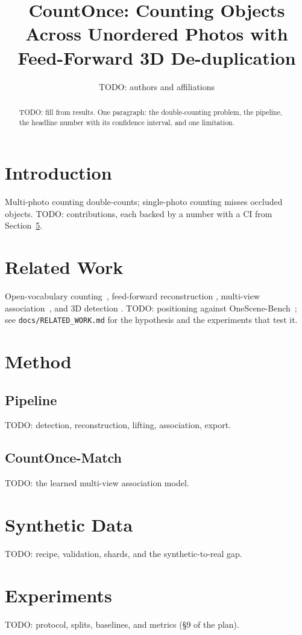 \documentclass[10pt,twocolumn]{article}
\title{CountOnce: Counting Objects Across Unordered Photos with Feed-Forward 3D De-duplication}
\author{TODO: authors and affiliations}
\date{}
\begin{document}
\maketitle

\begin{abstract}
TODO: fill from results. One paragraph: the double-counting problem, the pipeline, the headline
number with its confidence interval, and one limitation.
\end{abstract}

\section{Introduction}
Multi-photo counting double-counts; single-photo counting misses occluded objects.
TODO: contributions, each backed by a number with a CI from Section~\ref{sec:experiments}.

\section{Related Work}
Open-vocabulary counting~\cite{countgd,countgdpp,countvid}, feed-forward reconstruction
\cite{vggt,vggtomega,vggtttt}, multi-view association~\cite{cdog,rom,dgnet}, and 3D detection
\cite{vggtdet}. TODO: positioning against OneScene-Bench~\cite{onescenebench}; see
\texttt{docs/RELATED\_WORK.md} for the hypothesis and the experiments that test it.

\section{Method}
\subsection{Pipeline}
TODO: detection, reconstruction, lifting, association, export.
\subsection{CountOnce-Match}
TODO: the learned multi-view association model.

\section{Synthetic Data}
TODO: recipe, validation, shards, and the synthetic-to-real gap.

\section{Experiments}\label{sec:experiments}


TODO: protocol, splits, baselines, and metrics (\S9 of the plan).
\end{document}
